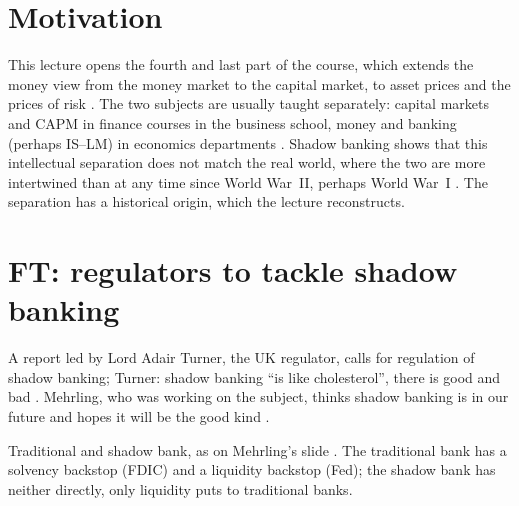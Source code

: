 \begin{paracol}{2}
\section*{Motivation}
This lecture opens the fourth and last part of the course, which extends the money view from the money market to the capital market, to asset prices and the
prices of risk . The two subjects are usually taught separately: capital markets and CAPM in finance courses in the
business school, money and banking (perhaps IS--LM) in economics departments . Shadow banking shows that this
intellectual separation does not match the real world, where the two are more intertwined than at any time since World War~II, perhaps World War~I
. The separation has a historical origin, which the lecture reconstructs.

\section{FT: regulators to tackle shadow banking}\label{sec:di-ft}

\begin{casestudy}
A report led by Lord Adair Turner, the UK regulator, calls for regulation of shadow banking; Turner: shadow banking ``is like cholesterol'', there is good and
bad . Mehrling, who was working on the subject, thinks shadow banking is in our future and hopes
it will be the good kind .
\end{casestudy}

\begin{nfigure}
\begin{taccts}
\qquad
{}
\end{taccts}
\caption{Traditional and shadow bank, as on Mehrling's slide . The traditional bank has a solvency backstop
(FDIC) and a liquidity backstop (Fed); the shadow bank has neither directly, only liquidity puts to traditional banks.}\label{fig:di-banks}
\end{nfigure}


\end{paracol}
